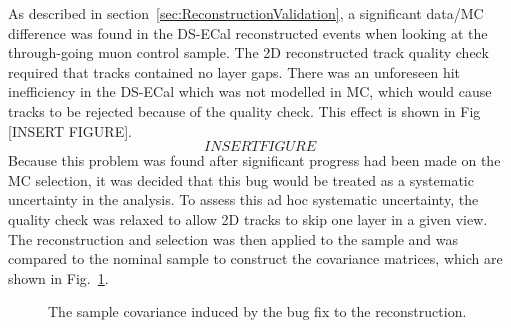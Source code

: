 \newline
\newline
As described in section~\ref{sec:ReconstructionValidation}, a significant data/MC difference was found in the DS-ECal reconstructed events when looking at the through-going muon control sample.  The 2D reconstructed track quality check required that tracks contained no layer gaps.  There was an unforeseen hit inefficiency in the DS-ECal which was not modelled in MC, which would cause tracks to be rejected because of the quality check.  This effect is shown in Fig [INSERT FIGURE].
\begin{equation}
INSERT FIGURE
\end{equation}
Because this problem was found after significant progress had been made on the MC selection, it was decided that this bug would be treated as a systematic uncertainty in the analysis.  To assess this ad hoc systematic uncertainty, the quality check was relaxed to allow 2D tracks to skip one layer in a given view.  The reconstruction and selection was then applied to the sample and was compared to the nominal sample to construct the covariance matrices, which are shown in Fig.~\ref{fig:ECalHoughBugCovarianceMatrices}.
\begin{figure}%
  \centering
  \caption{The sample covariance induced by the bug fix to the reconstruction.}
  \label{fig:ECalHoughBugCovarianceMatrices}
\end{figure}
